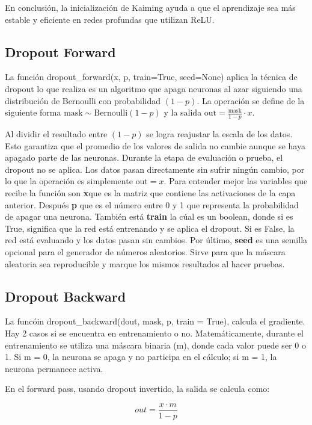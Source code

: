 \documentclass[12pt]{article}
\begin{document}
En conclusión, la inicialización de Kaiming ayuda a que el aprendizaje sea más estable y eficiente en redes profundas que utilizan ReLU.

\subsection{Dropout Forward}

La función dropout\_forward(x, p, train=True, seed=None) aplica la técnica de dropout lo que realiza es un algoritmo que 
apaga neuronas al azar siguiendo una distribución de Bernoulli con probabilidad $(1 - p)$. 
La operación se define de la siguiente forma
$\text{mask} \sim \text{Bernoulli}(1 - p)$ 
y la salida 
$\text{out} = \frac{\text{mask}}{1 - p} \cdot x$.

Al dividir el resultado entre $(1 - p)$ se logra reajustar la escala de los datos. 
Esto garantiza que el promedio de los valores de salida no cambie aunque se haya apagado parte de las neuronas. 
Durante la etapa de evaluación o prueba, el dropout no se aplica. Los datos pasan directamente sin sufrir ningún cambio, por lo que la operación es simplemente $\text{out} = x$.
Para entender mejor las variables que recibe la función son \textbf{x}que es la matriz que 
contiene las activaciones de la capa anterior. Después \textbf{p} que es el número entre 0 y 1 que representa la probabilidad de apagar una neurona.
También está \textbf{train} la cúal es un boolean, donde si es True, significa que la red está entrenando y se aplica el dropout. Si es False, la red está evaluando y los datos pasan sin cambios. 
Por último, \textbf{seed} es una semilla opcional para el generador de números aleatorios. Sirve para que la máscara aleatoria sea reproducible y marque los mismos resultados al hacer pruebas.


\subsection{Dropout Backward}

La funcóin dropout\_backward(dout, mask, p, train = True), calcula el gradiente. Hay 2 casos si se encuentra en 
entrenamiento o no. Matemáticamente, durante el entrenamiento se utiliza una máscara binaria (m), donde cada 
valor puede ser 0 o 1. Si m = 0, la neurona se apaga y no participa 
en el cálculo; si m = 1, la neurona permanece activa.

En el forward pass, usando dropout invertido, la salida se calcula como:

$$
out = \frac{x \cdot m}{1-p}
$$
\end{document}
